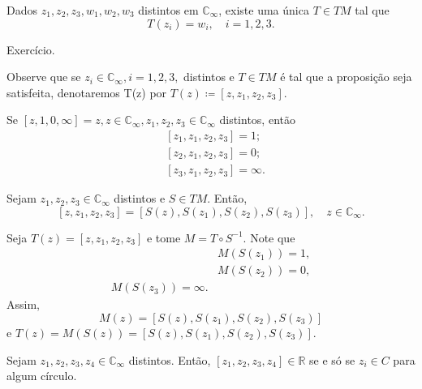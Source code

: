 \documentclass[complex.tex]{subfiles}
\begin{document}
\begin{crl*}
	Dados $z_1, z_2, z_3, w_1, w_2, w_3$ distintos em $\mathbb{C}_{\infty}$, existe uma única $T\in{TM}$ tal que
	$$
		T(z_{i}) = w_{i}, \quad i=1, 2, 3.
	$$
\end{crl*}
\begin{proof*}
	Exercício. \qedsymbol
\end{proof*}
Observe que se $z_{i}\in \mathbb{C}_{\infty}, i = 1, 2, 3,$ distintos e $T\in{TM}$ é tal que a proposição
seja satisfeita, denotaremos T(z) por  $T(z) \coloneqq  [z, z_1, z_2, z_3].$
\begin{example}
	Se $[z, 1, 0, \infty] = z, z\in \mathbb{C}_{\infty}, z_1, z_2, z_3\in \mathbb{C}_{\infty}$ distintos, então
	\begin{align*}
		 & [z_1, z_1, z_2, z_3] = 1;      \\
		 & [z_2, z_1, z_2, z_3] = 0;      \\
		 & [z_3, z_1, z_2, z_3] = \infty.
	\end{align*}
\end{example}
\begin{prop*}
	Sejam $z_1, z_2, z_3\in \mathbb{C}_{\infty}$ distintos e $S\in{TM}.$ Então,
	$$
		[z, z_1, z_2, z_3] = [S(z), S(z_1), S(z_2), S(z_3)], \quad z\in \mathbb{C}_{\infty}.
	$$
\end{prop*}
\begin{proof*}
	Seja $T(z) = [z, z_1, z_2, z_3]$ e tome $M = T\circ{S^{-1}}.$ Note que
	\begin{align*}
		 & M(S(z_1)) = 1, \\
		 & M(S(z_2)) = 0, \\
		M(S(z_3)) = \infty.
	\end{align*}
	Assim,
	$$
		M(z) = [S(z), S(z_1), S(z_2), S(z_3)]
	$$
	e $T(z) = M(S(z)) = [S(z), S(z_1), S(z_2), S(z_3)]$. \qedsymbol
\end{proof*}
\begin{prop*}
	Sejam $z_1, z_2, z_3, z_4\in \mathbb{C}_{\infty}$ distintos. Então, $[z_1, z_2, z_3, z_4]\in \mathbb{R}$ se e só se
	$z_{i}\in{C}$ para algum círculo.
\end{prop*}
\end{document}
